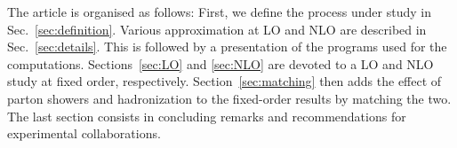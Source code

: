 The article is organised as follows:
First, we define the process under study in Sec.~\ref{sec:definition}.
Various approximation at LO and NLO are described in Sec.~\ref{sec:details}.
This is followed by a presentation of the programs used for the computations.
Sections~\ref{sec:LO} and \ref{sec:NLO} are devoted to a LO and NLO study at fixed order, respectively.
Section~\ref{sec:matching} then adds the effect of parton showers and hadronization to the fixed-order results by matching the two.
The last section consists in concluding remarks and recommendations for experimental collaborations.
